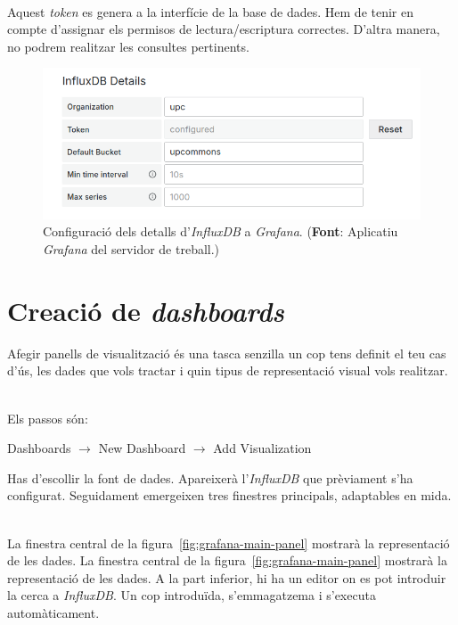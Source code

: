 \noindent \\
Aquest \textit{token} es genera a la interfície de la base de dades.
Hem de tenir en compte d'assignar els permisos de lectura/escriptura correctes.
D'altra manera, no podrem realitzar les consultes pertinents.

\begin{figure}[htbp]
    \centerline{\includegraphics[width=\textwidth]{figures/grafana-influxdb-details}}
    \captionsetup{justification=centering}
    \caption[Configuració dels detalls d'\textit{InfluxDB} a \textit{Grafana}.]{Configuració dels detalls d'\textit{InfluxDB} a \textit{Grafana}. (\textbf{Font}: Aplicatiu \textit{Grafana} del servidor de treball.)}\label{fig:grafana-influxdb-details}
\end{figure}

\clearpage

\section*{Creació de \textit{dashboards}}\label{sec:grafana-dashboards}

\noindent
Afegir panells de visualització és una tasca senzilla un cop tens definit el teu cas d'ús, les dades que vols tractar i quin tipus de representació visual vols realitzar.

\noindent \\
Els passos són:
\begin{center}
    Dashboards \(\rightarrow\) New Dashboard \(\rightarrow\) Add Visualization
\end{center}

\noindent
Has d'escollir la font de dades.
Apareixerà l'\textit{InfluxDB} que prèviament s'ha configurat.
Seguidament emergeixen tres finestres principals, adaptables en mida.

\noindent \\
La finestra central de la figura~\ref{fig:grafana-main-panel} mostrarà la representació de les dades.
La finestra central de la figura~\ref{fig:grafana-main-panel} mostrarà la representació de les dades.
A la part inferior, hi ha un editor on es pot introduir la cerca a \textit{InfluxDB}.
Un cop introduïda, s'emmagatzema i s'executa automàticament.

